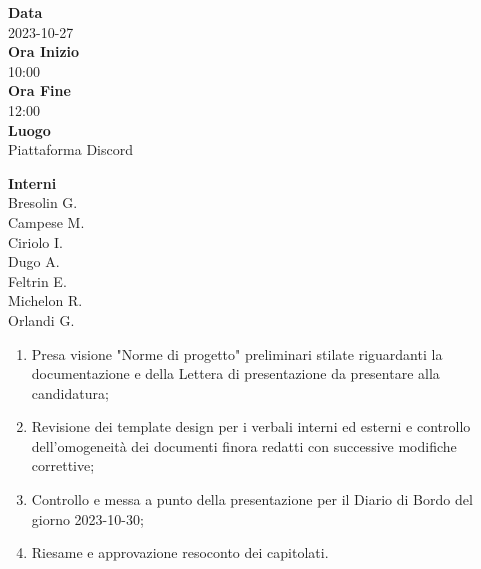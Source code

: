 \documentclass{article}
\begin{document}
\setlength{\columnsep}{2.2em}
\setlength{\columnseprule}{4pt}
\begin{paracol}{2}


\textbf{Data} \\
2023-10-27\\

\textbf{Ora Inizio} \\
10:00\\

\textbf{Ora Fine} \\
12:00\\

\textbf{Luogo} \\
Piattaforma Discord

\vspace{12.6em}


\textbf{Interni} \\
Bresolin G.\\
Campese M.\\
Ciriolo I.\\
Dugo A.\\
Feltrin E.\\
Michelon R.\\
Orlandi G.\\


\switchcolumn



\begin{enumerate}
    \item Presa visione "Norme di progetto" preliminari stilate riguardanti la documentazione e della Lettera di presentazione da presentare alla candidatura;
    \item Revisione dei template design per i verbali interni ed esterni e controllo dell'omogeneità dei documenti finora redatti con successive modifiche correttive;
    \item Controllo e messa a punto della presentazione per il Diario di Bordo del giorno 2023-10-30;
    \item Riesame e approvazione resoconto dei capitolati.
\end{enumerate}

\vspace{14.7em}


\end{paracol}
\end{document}
